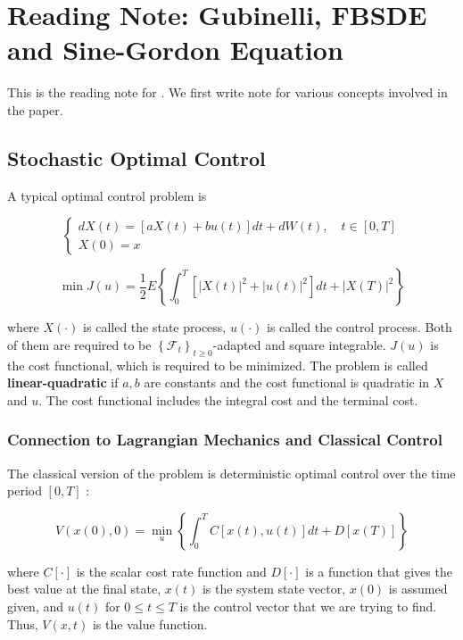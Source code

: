 \section{Reading Note: Gubinelli, FBSDE and Sine-Gordon Equation}
\label{sec:gubinelliFBSDESineGordon2024}

This is the reading note for \autocite{gubinelliFBSDESineGordon2024}. We first write note for various concepts involved in the paper.

\subsection{Stochastic Optimal Control}
\label{subsec:optimalControl}

A typical optimal control problem is

\[
\left\{\begin{array}{l}
d X(t)=[a X(t)+b u(t)] d t+d W(t), \quad t \in[0, T] \\
X(0)=x
\end{array}\right.
\]

\[
\min J(u)=\frac{1}{2} E\left\{\int_0^T\left[|X(t)|^2+|u(t)|^2\right] d t+|X(T)|^2\right\}
\]

where $X(\cdot)$ is called the state process, $u(\cdot)$ is called the control process. Both of them are required to be $\left\{\mathcal{F}_t\right\}_{t \geq 0}$-adapted and square integrable. $J(u)$ is the cost functional, which is required to be minimized. The problem is called \textbf{linear-quadratic} if $a, b$ are constants and the cost functional is quadratic in $X$ and $u$. The cost functional includes the integral cost and the terminal cost. 

\subsubsection{Connection to Lagrangian Mechanics and Classical Control}

The classical version of the problem is deterministic optimal control over the time period $[0, T]$ :

\[
V(x(0), 0)=\min _u\left\{\int_0^T C[x(t), u(t)] d t+D[x(T)]\right\}
\]

where $C[\cdot]$ is the scalar cost rate function and $D[\cdot]$ is a function that gives the best value at the final state, $x(t)$ is the system state vector, $x(0)$ is assumed given, and $u(t)$ for $0 \leq t \leq T$ is the control vector that we are trying to find. Thus, $V(x, t)$ is the value function.

